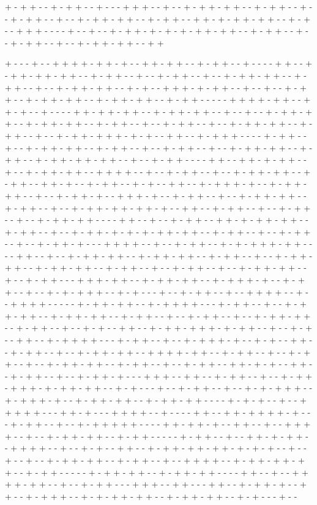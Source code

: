 + - + + - - + - + + - - + - - - + + + - - + - - + - + + - + + - - + - + + - - + - - + - + + - - + - - + - + + - + + - - + - + + - - + + - + - + + - + + - - + - + - - + + + - - - - + - - + - - + - + + - + - + - + - + + - + + - - + - + + - - + - - + - + + - - + - - + - + + - + + - - + + 

+ - - - + - - + + + + - + + - + - - + + - + + - - + - + + - - + - - - - + + - - + - + + - + + - + + - - + - + + - - + - - + - + + - - + - - + - + + - + + - - + - + + - - + - - + - + + - + + - - + - + - - + + + - + - + + - - + - - + - - + - + + - - + - + + - + + - - + - + + - + + - - + - + + - - - - - + + + + - + + - - + + - + - - + - - - - + + - + + - + + - - + - + + - + + - - + - - + - - + - + + - + + - - + - + + - + + - - + - + + - - + - - + - + + - - + - - + - + + - + + - - + - + + - - + - - + - + + - + + + - + - + - - + + - - + - + + + - - - - + - + + - - + - - + - + + - + + - - + - + + - - + - - + - + + - - + - - + - + + - + + - - + - + + - - + - + + - + + - + + - - + - - + - + + - - - - + + - - + + - + - + + - - + - - + - + + - + + - - + + + + - - + - - + - + + - - + - - + - + + - + + - - + - + + - - + + - + - - + - + + - - + - + - - + + - - + - + + + - + - - + - + + - + + - - + - - + - + + - + - - + + + - + - - + - + + - - + - - + - + + - + + - - + - + + - - + - - + - + + - + + - + + - + - - + + - - + - + + - - + - - + - + + - - + - - + - + + - + + - - - - + + - - + - - + - + + - - + + - + - + + - + + - - + - + + - - + - - + - + + - + - + - + - + + - + + - - + - + + - - + - - + - + + - - + - - + - + + - + - - - + + + + - - + - - + - + + - - + - + - + + + - + + - - - - + + - - + - - + - + + - + + - - + - + + - + + - - + - + + - - + - - + - + + - + + - - + - + + - + + - - + - + + - - + - - + - + + - - + - - + - + + - + + - - + - - + - + + - - - + + + - + + - - + - + + - + + - - + - + + + - + - - + - + + - - + - - + - + - + + + - - + - + - - - + - - + - + + - - + - - + + + + - - + - - + + + + - - - - - + - + + - + + - - + - + + + + - - - + - + + - - + - - + - + + - + + - - + - + + - + + - - + - + + - - + - - + - + + - - + - - + - + + - + + - - + - + + - - + - - + - + - - + + - - + - + + - + + + - + - + + - - + - - + - + - - + + - - + - + + + + - - - + - + + - - + - - + - + + + - + - - + - + - - + + - - + - + + - - + - - + - + + - + + - - + + + + - + + - - + - + + - - + - - + - + + - - + - - + - + + - + + - - + - + + - - + - - + - + + - - + + - + - + - - + + - - + - + + - - + - - + - + + - + - - - + + + - - + + - - + - + + - - + - - + - + + - + + + - + - + + - + + - - + - + - - - + - - + - + + - - + - - + - + - + + + - - + - + + + - + - - + - + + - + + - - + - + + - + + - - - - + - + - + - - + - - + + + + + - - - + + - + - - - + + + + - - + - - - - + + - - + + - + + + + - + - - - + - + + - - + - - + - + + + + + - - - - + + - + + - + - - + + - - + - - + + + + - - + - - + - + + - + + - - + - + + - - - - - + - + + - - + - - + + - + - + + - - + + + + - - + - - + - + - - + + - - + - + + - + + - + + - + - + - + - - + - - + - - + - - + - + + - + + - - + - + + - - + - - + + + + - - + - + + - + + - + + - - + - + + - - - - - + - + + - + + - - + - + + - + + - - - - + + - - + - - + + + + - + + - - + - - + - + + - - - + + + - - + + - - - + + - - + - + + - + - - + + - - + - + + + - - + - + - + + - + + - - + - + + - + + - - + - + - - - + - - 